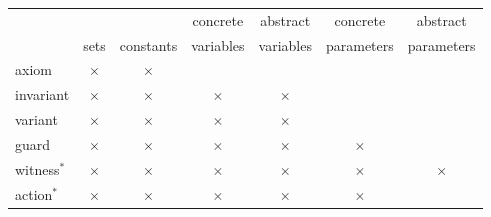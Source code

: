 \begin{center}
  \newcommand{\markcell}{$\times$}
  \begin{tabular}{lcccccc}
  \hline
            &           &           & concrete  & abstract  & concrete   & abstract \\
            & sets      & constants & variables & variables & parameters & parameters \\
  \hline
  axiom     & \markcell & \markcell &           &           &            & \\
  invariant & \markcell & \markcell & \markcell & \markcell &            & \\
  variant   & \markcell & \markcell & \markcell & \markcell &            & \\
  guard     & \markcell & \markcell & \markcell & \markcell & \markcell  & \\
  witness$^{*}$   & \markcell & \markcell & \markcell & \markcell & \markcell  & \markcell \\
  action$^{*}$    & \markcell & \markcell & \markcell & \markcell & \markcell  &  \\
  \hline
  \end{tabular}    
\end{center}

